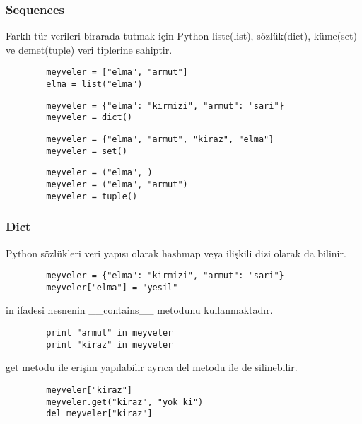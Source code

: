 \documentclass[10pt, compress]{beamer}
\begin{document}
\begin{frame}[fragile]
\frametitle{Sequences}    
    Farklı tür verileri birarada tutmak için Python \alert{liste(list), sözlük(dict), küme(set)} ve \alert{demet(tuple)} veri tiplerine sahiptir.
    
    \begin{verbatim}
        meyveler = ["elma", "armut"]
        elma = list("elma")
    \end{verbatim}  

    \begin{verbatim}
        meyveler = {"elma": "kirmizi", "armut": "sari"}
        meyveler = dict()
    \end{verbatim} 

    \begin{verbatim}
        meyveler = {"elma", "armut", "kiraz", "elma"}
        meyveler = set()
    \end{verbatim}     

    \begin{verbatim}
        meyveler = ("elma", )
        meyveler = ("elma", "armut")
        meyveler = tuple()
    \end{verbatim}         
    
\end{frame}

\begin{frame}[fragile]
\frametitle{Dict}    
    Python sözlükleri veri yapısı olarak \alert{hashmap} veya \alert{ilişkili dizi} olarak da bilinir.
    \begin{verbatim}
        meyveler = {"elma": "kirmizi", "armut": "sari"}
        meyveler["elma"] = "yesil"
    \end{verbatim} 
    \alert{in} ifadesi nesnenin \alert{\_\_contains\_\_} metodunu kullanmaktadır.
    \begin{verbatim}
        print "armut" in meyveler
        print "kiraz" in meyveler
    \end{verbatim}     
    \alert{get} metodu ile erişim yapılabilir ayrıca \alert{del} metodu ile de silinebilir.
    \begin{verbatim}
        meyveler["kiraz"]
        meyveler.get("kiraz", "yok ki")
        del meyveler["kiraz"]
    \end{verbatim}        
\end{frame}
\end{document}
